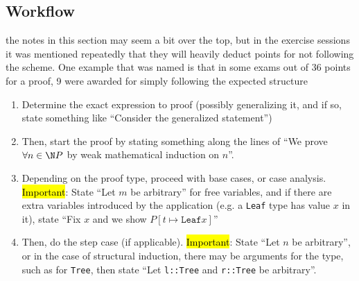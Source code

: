 \subsection{Workflow}
{\scriptsize the notes in this section may seem a bit over the top,
    but in the exercise sessions it was mentioned repeatedly that they will heavily deduct points for not following the scheme.
    One example that was named is that in some exams out of 36 points for a proof, 9 were awarded for simply following the expected structure}
\begin{enumerate}
    \item Determine the exact expression to proof (possibly generalizing it, and if so, state something like ``Consider the generalized statement'')
    \item Then, start the proof by stating something along the lines of ``We prove $\forall n \in \N P$ by weak mathematical induction on $n$''.
    \item Depending on the proof type, proceed with base cases, or case analysis. \hl{Important}: State ``Let $m$ be arbitrary'' for free variables,
          and if there are extra variables introduced by the application (e.g. a \texttt{Leaf} type has value $x$ in it), state ``Fix $x$ and we show $P[t \mapsto \texttt{Leaf} x]$''
    \item Then, do the step case (if applicable). \hl{Important}: State ``Let $n$ be arbitrary'', or in the case of structural induction, there may be arguments for the type,
          such as for \texttt{Tree}, then state ``Let \texttt{l::Tree} and \texttt{r::Tree} be arbitrary''.
\end{enumerate}
